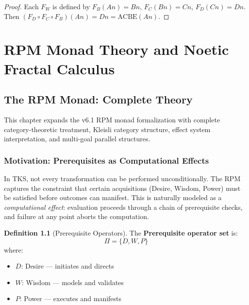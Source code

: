 \documentclass[11pt,twoside,openright]{book}
\theoremstyle{definition}
\newtheorem{definition}{Definition}[chapter]
\theoremstyle{plain}
\theoremstyle{remark}
\newcommand{\vexp}{\textcolor{green!50!black}{\textbf{[EXPANDED v7.0]}}}
\begin{document}
\begin{proof}
Each $F_W$ is defined by $F_B(An) = Bn$, $F_C(Bn) = Cn$, $F_D(Cn) = Dn$.
Then $(F_D \circ F_C \circ F_B)(An) = Dn = \mathrm{ACBE}(An)$.
\end{proof}

\part{RPM Monad Theory and Noetic Fractal Calculus}

\chapter{The RPM Monad: Complete Theory}
\label{ch:rpm-monad}

\begin{tcolorbox}[colback=green!5!white,colframe=green!75!black,title=\vexp]
This chapter expands the v6.1 RPM monad formalization with complete category-theoretic treatment, Kleisli category structure, effect system interpretation, and multi-goal parallel structures.
\end{tcolorbox}

\section{Motivation: Prerequisites as Computational Effects}

In TKS, not every transformation can be performed unconditionally. The RPM captures the constraint that certain acquisitions (Desire, Wisdom, Power) must be satisfied before outcomes can manifest. This is naturally modeled as a \emph{computational effect}: evaluation proceeds through a chain of prerequisite checks, and failure at any point aborts the computation.

\begin{definition}[Prerequisite Operators]
\label{def:prereq-ops}
The \textbf{Prerequisite operator set} is:
\[
\Pi = \{D, W, P\}
\]
where:
\begin{itemize}
  \item $D$: Desire --- initiates and directs
  \item $W$: Wisdom --- models and validates
  \item $P$: Power --- executes and manifests
\end{itemize}
\end{definition}
\end{document}
